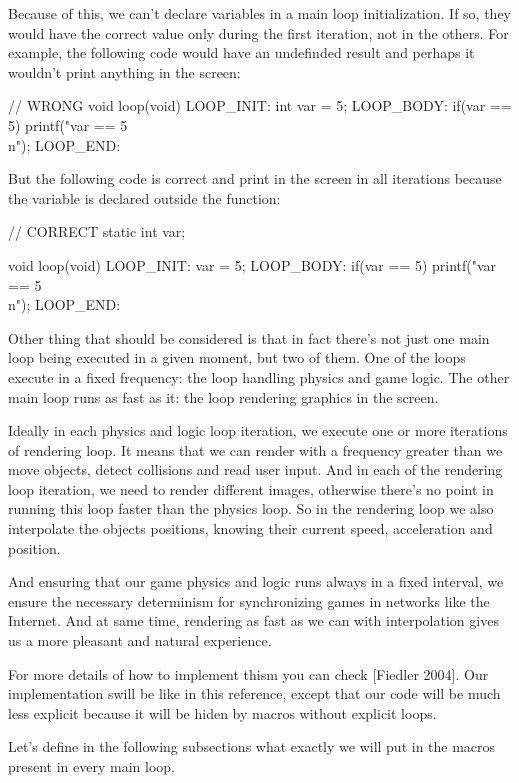 Because of this, we can't declare variables in a main loop
initialization. If so, they would have the correct value only during
the first iteration, not in the others. For example, the following
code would have an undefinded result and perhaps it wouldn't print
anything in the screen:

\alinhaverbatim
// WRONG
void loop(void){
LOOP\_INIT:
  int var = 5;
LOOP\_BODY:
  if(var == 5)
    printf("var == 5\\n");
LOOP\_END:
}
\alinhanormal

But the following code is correct and print in the screen in all
iterations because the variable is declared outside the function:

\alinhaverbatim
// CORRECT
static int var;

void loop(void){
LOOP\_INIT:
  var = 5;
LOOP\_BODY:
  if(var == 5)
    printf("var == 5\\n");
LOOP\_END:
}
\alinhanormal

Other thing that should be considered is that in fact there's not just
one main loop being executed in a given moment, but two of them. One
of the loops execute in a fixed frequency: the loop handling physics
and game logic. The other main loop runs as fast as it: the loop
rendering graphics in the screen.

Ideally in each physics and logic loop iteration, we execute one or
more iterations of rendering loop. It means that we can render with a
frequency greater than we move objects, detect collisions and read
user input. And in each of the rendering loop iteration, we need to
render different images, otherwise there's no point in running this
loop faster than the physics loop. So in the rendering loop we also
interpolate the objects positions, knowing their current speed,
acceleration and position.

And ensuring that our game physics and logic runs always in a fixed
interval, we ensure the necessary determinism for synchronizing games
in networks like the Internet. And at same time, rendering as fast as
we can with interpolation gives us a more pleasant and natural
experience.

For more details of how to implement thism you can check [Fiedler
2004]. Our implementation swill be like in this reference, except that
our code will be much less explicit because it will be hiden by macros
without explicit loops.

Let's define in the following subsections what exactly we will put in
the macros present in every main loop.

